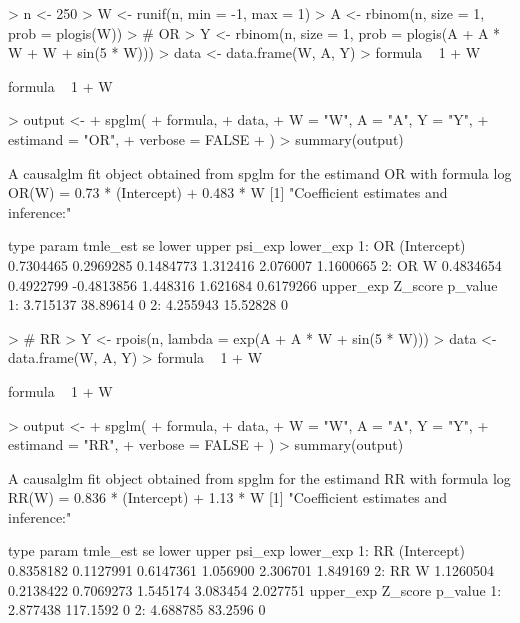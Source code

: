 \documentclass[article]{jss}
\begin{document}
\begin{Schunk}
\begin{Sinput}
> n <- 250
> W <- runif(n, min = -1, max = 1)
> A <- rbinom(n, size = 1, prob = plogis(W))
> # OR
> Y <- rbinom(n, size = 1, prob = plogis(A + A * W + W + sin(5 * W)))
> data <- data.frame(W, A, Y)
> formula ~ 1 + W
\end{Sinput}
\begin{Soutput}
formula ~ 1 + W
\end{Soutput}
\begin{Sinput}
> output <-
+   spglm(
+     formula,
+     data,
+     W = "W", A = "A", Y = "Y",
+     estimand = "OR",
+     verbose = FALSE
+   )
> summary(output)
\end{Sinput}
\begin{Soutput}
A causalglm fit object obtained from spglm for the estimand OR with formula 
log OR(W) = 0.73 * (Intercept) + 0.483 * W
[1] "Coefficient estimates and inference:"

   type       param  tmle_est        se      lower    upper  psi_exp lower_exp
1:   OR (Intercept) 0.7304465 0.2969285  0.1484773 1.312416 2.076007 1.1600665
2:   OR           W 0.4834654 0.4922799 -0.4813856 1.448316 1.621684 0.6179266
   upper_exp  Z_score p_value
1:  3.715137 38.89614       0
2:  4.255943 15.52828       0
\end{Soutput}
\begin{Sinput}
> # RR
> Y <- rpois(n, lambda = exp(A + A * W + sin(5 * W)))
> data <- data.frame(W, A, Y)
> formula ~ 1 + W
\end{Sinput}
\begin{Soutput}
formula ~ 1 + W
\end{Soutput}
\begin{Sinput}
> output <-
+   spglm(
+     formula,
+     data,
+     W = "W", A = "A", Y = "Y",
+     estimand = "RR",
+     verbose = FALSE
+   )
> summary(output)
\end{Sinput}
\begin{Soutput}
A causalglm fit object obtained from spglm for the estimand RR with formula 
log RR(W) = 0.836 * (Intercept) + 1.13 * W
[1] "Coefficient estimates and inference:"

   type       param  tmle_est        se     lower    upper  psi_exp lower_exp
1:   RR (Intercept) 0.8358182 0.1127991 0.6147361 1.056900 2.306701  1.849169
2:   RR           W 1.1260504 0.2138422 0.7069273 1.545174 3.083454  2.027751
   upper_exp  Z_score p_value
1:  2.877438 117.1592       0
2:  4.688785  83.2596       0
\end{Soutput}
\end{Schunk}
\end{document}
